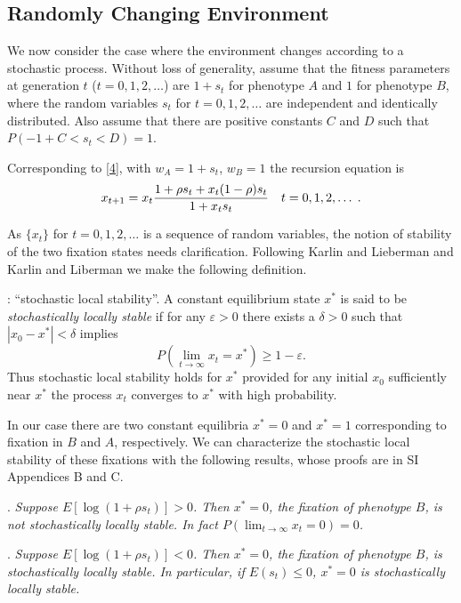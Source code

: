 \documentclass[9pt,twocolumn,twoside,lineno]{pnas-new}
\newcommand{\var}{\varepsilon}
\begin{document}
 
\subsection{Randomly Changing Environment}
 
 We now consider the  case where the environment changes according to a stochastic process. Without loss of generality, assume that the fitness parameters at generation $t$ ($t=0,1,2,\dots$) are $1+s_t$ for phenotype $A$ and $1$ for phenotype $B$, where the random variables $s_t$ for $t=0,1,2,\dots$ are independent and identically distributed. Also assume that there are positive constants $C$ and $D$ such that $P(-1+C<s_t <D)=1$.
 
 Corresponding to \eqref{4}, with $w_A=1+s_t$, $w_B=1$ the recursion equation is
 \begin{equation}
 x_{t+1}=x_t {1+\rho s_t +x_t(1-\rho)s_t\over 1+x_ts_t}\quad t=0,1,2,\dots\; .\label{28}\end{equation}
 
\noindent As $\{x_t\}$ for $t=0,1,2,\dots$ is a sequence of random variables, the notion of stability of the two fixation states needs clarification. Following Karlin and Lieberman \cite{karlin1974random} and Karlin and Liberman \cite{karlin1975random} we make the following definition.
 \medskip
 
 : ``stochastic local stability''.
 A constant equilibrium state $x^*$ is said to be {\sl stochastically locally stable} if for any $\var>0$ there exists a $\delta>0$ such that $|x_0-x^*|<\delta$ implies
 \begin{equation}
 P\left(\lim_{t\to\infty}x_t =x^*\right)\ge 1-\var.\label{29}\end{equation}
 Thus stochastic local stability holds for $x^*$ provided for any initial $x_0$ sufficiently near $x^*$ the process $x_t$ converges to $x^*$ with high probability.
 
 In our case there are two constant equilibria $x^*=0$ and $x^*=1$ corresponding to fixation in $B$ and $A$, respectively. We can characterize the stochastic local stability of these fixations with the following results, whose proofs are in SI Appendices B and C.
 \medskip
 
 . {\sl Suppose $E\left[\log (1+\rho s_t)\right]>0$. Then $x^*=0$, the fixation of phenotype $B$, is not stochastically locally stable. In fact $P\left(\lim_{t\to\infty}x_t=0\right)=0$.}
 \medskip
 
  . {\sl Suppose $E[\log(1+\rho s_t)]<0$. Then $x^*=0$, the fixation of phenotype $B$, is stochastically locally stable. In particular, if $E(s_t)\le 0$, $x^*=0$ is stochastically locally stable.}
  
\end{document}
